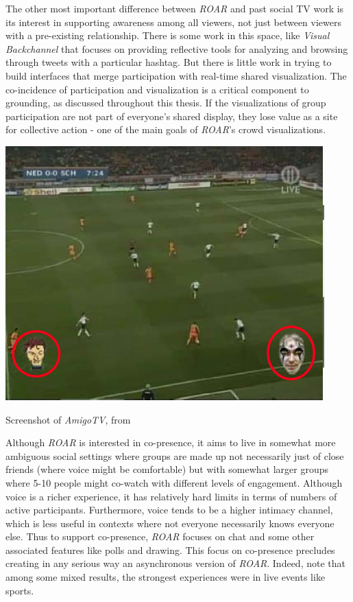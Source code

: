 The other most important difference between \emph{ROAR} and past social TV work is its interest in supporting awareness among all viewers, not just between viewers with a pre-existing relationship. There is some work in this space, like \emph{Visual Backchannel} \citep{Dork:2010fb} that focuses on providing reflective tools for analyzing and browsing through tweets with a particular hashtag. But there is little work in trying to build interfaces that merge participation with real-time shared visualization. The co-incidence of participation and visualization is a critical component to grounding, as discussed throughout this thesis. If the visualizations of group participation are not part of everyone's shared display, they lose value as a site for collective action - one of the main goals of \emph{ROAR}'s crowd visualizations.

\begin{marginfigure}
	\includegraphics{figures/roar/amigotv.png}
	\caption{Screenshot of \emph{AmigoTV}, from \citep{coppens2004amigotv}}
	\label{fig:amigotv}
\end{marginfigure}

Although \emph{ROAR} is interested in co-presence, it aims to live in somewhat more ambiguous social settings where groups are made up not necessarily just of close friends (where voice might be comfortable) but with somewhat larger groups where 5-10 people might co-watch with different levels of engagement. Although voice is a richer experience, it has relatively hard limits in terms of numbers of active participants. Furthermore, voice tends to be a higher intimacy channel, which is less useful in contexts where not everyone necessarily knows everyone else. Thus to support co-presence, \emph{ROAR} focuses on chat and some other associated features like polls and drawing. This focus on co-presence precludes creating in any serious way an asynchronous version of \emph{ROAR}. Indeed, \citet{uses.socialTV} note that among some mixed results, the strongest experiences were in live events like sports. 




